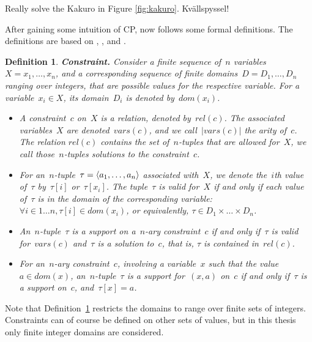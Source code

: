 \documentclass[a4paper,11pt]{article}
\newtheorem{definition}{Definition}
\newcommand{\Todo}[1]{{\color{blue}#1}}
\numberwithin{equation}{section}
\begin{document}
\Todo{Really solve the Kakuro in Figure \ref{fig:kakuro}. Kvällspyssel!}

\smallskip 

After gaining some intuition of CP, now follows some formal definitions.
The definitions are based on
\cite{SchulteCarlsson:FDsys}, \cite{Apt:constraintsBook}, and \cite{Gecode:MPG}.

\begin{definition}
  \label{def:constraint}
  \textbf{Constraint.} Consider a finite sequence of~$n$ 
  variables~$X = x_1,\ldots,x_n$, and a corresponding sequence of
  finite \emph{domains}~$D = D_1,\ldots,D_n$ ranging over integers,
  that are possible values for the
  respective variable. 
  For a variable~$x_i \in X$, its domain~$D_i$ is denoted 
  by~$dom(x_i)$.
  \begin{itemize}
    \item   A \emph{constraint}~$c$ on~$X$ is a relation, 
      denoted by~$rel(c)$. The associated variables~$X$ are denoted~$vars(c)$,
      and we call~$|vars(c)|$ the \emph{arity} of~$c$. The relation
      $rel(c)$ contains the set of~$n$-tuples that are allowed
      for~$X$, we call those~$n$-tuples \emph{solutions} to the constraint~$c$.
    \item   For an~$n$-tuple~$\tau = \left\langle a_1,\ldots,a_n\right\rangle$ associated with~$X$, we
      denote the~$i$th value of~$\tau$ by~$\tau[i]$ or~$\tau[x_i]$. The 
      tuple~$\tau$ is \emph{valid} for~$X$
      if and only if each value of~$\tau$ is in the domain of the corresponding
      variable: $\forall i \in 1 \ldots n, \tau[i] \in dom(x_i)$, or equivalently,
      $\tau \in D_1 \times \ldots \times D_n$.
    \item An~$n$-tuple~$\tau$ is a \emph{support} on a~$n$-ary constraint~$c$ if and only
      if~$\tau$ is valid for~$vars(c)$ and~$\tau$ is a solution to~$c$, that is,
      $\tau$ is contained in~$rel(c)$.
    \item For an~$n$-ary constraint~$c$, involving a variable~$x$ such that
      the value~$a \in dom(x)$, an~$n$-tuple~$\tau$ is a 
      \emph{support for}~$(x,a)$ on~$c$ if and only if~$\tau$ is a support on~$c$,
      and~$\tau[x] = a$.
    \end{itemize}
\end{definition}

Note that Definition~\ref{def:constraint} restricts the domains to range
over finite sets of integers. Constraints can of course be defined on
other sets of values, but in this thesis only finite integer domains
are considered.
\end{document}
